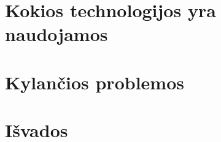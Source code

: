 \documentclass[11pt,a4paper]{article}
\begin{document}


\section{Kokios technologijos yra naudojamos}



\section{Kylančios problemos}

\section{Išvados}



\renewcommand\refname{Literatūros ir informacinių šaltinių sąrašas}



\end{document}
